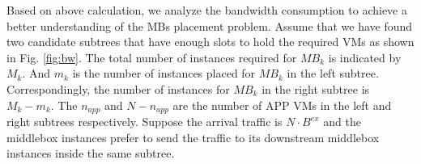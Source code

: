 \documentclass[review]{elsarticle}
\begin{document}

Based on above calculation, we analyze the bandwidth consumption to achieve a better understanding of the MBs placement problem. Assume that we have found two candidate subtrees that have enough slots to hold the required VMs as shown in Fig. \ref{fig:bw}. The total number of instances required for $MB_k$ is indicated by $M_k$. And $m_k$ is the number of instances placed for $MB_k$  in the left subtree. %
 Correspondingly, the number of instances for $MB_k$ in the right subtree is $M_k-m_k$. The $n_{app}$ and $N-n_{app}$ are the number of APP VMs in the left and right subtrees respectively. Suppose the arrival traffic is $N \cdot B^{ex}$ and the middlebox instances prefer to send the traffic to its downstream middlebox instances inside the same subtree.
\end{document}
